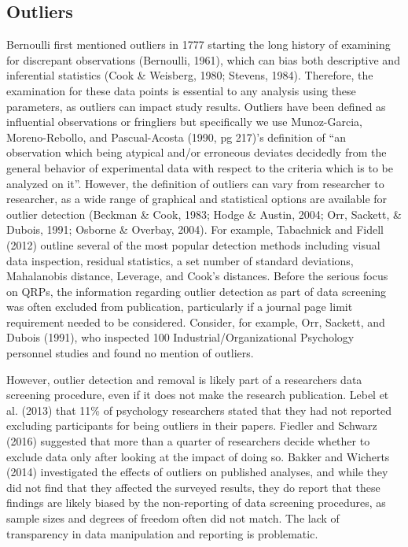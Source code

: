 \documentclass[english,man]{apa6}
\theoremstyle{definition}
\theoremstyle{definition}
\theoremstyle{definition}
\theoremstyle{remark}
\begin{document}
\subsection{Outliers}\label{outliers}

Bernoulli first mentioned outliers in 1777 starting the long history of
examining for discrepant observations (Bernoulli, 1961), which can bias
both descriptive and inferential statistics (Cook \& Weisberg, 1980;
Stevens, 1984). Therefore, the examination for these data points is
essential to any analysis using these parameters, as outliers can impact
study results. Outliers have been defined as influential observations or
fringliers but specifically we use Munoz-Garcia, Moreno-Rebollo, and
Pascual-Acosta (1990, pg 217)'s definition of \enquote{an observation
which being atypical and/or erroneous deviates decidedly from the
general behavior of experimental data with respect to the criteria which
is to be analyzed on it}. However, the definition of outliers can vary
from researcher to researcher, as a wide range of graphical and
statistical options are available for outlier detection (Beckman \&
Cook, 1983; Hodge \& Austin, 2004; Orr, Sackett, \& Dubois, 1991;
Osborne \& Overbay, 2004). For example, Tabachnick and Fidell (2012)
outline several of the most popular detection methods including visual
data inspection, residual statistics, a set number of standard
deviations, Mahalanobis distance, Leverage, and Cook's distances. Before
the serious focus on QRPs, the information regarding outlier detection
as part of data screening was often excluded from publication,
particularly if a journal page limit requirement needed to be
considered. Consider, for example, Orr, Sackett, and Dubois (1991), who
inspected 100 Industrial/Organizational Psychology personnel studies and
found no mention of outliers.

However, outlier detection and removal is likely part of a researchers
data screening procedure, even if it does not make the research
publication. Lebel et al. (2013) that 11\% of psychology researchers
stated that they had not reported excluding participants for being
outliers in their papers. Fiedler and Schwarz (2016) suggested that more
than a quarter of researchers decide whether to exclude data only after
looking at the impact of doing so. Bakker and Wicherts (2014)
investigated the effects of outliers on published analyses, and while
they did not find that they affected the surveyed results, they do
report that these findings are likely biased by the non-reporting of
data screening procedures, as sample sizes and degrees of freedom often
did not match. The lack of transparency in data manipulation and
reporting is problematic.
\end{document}

